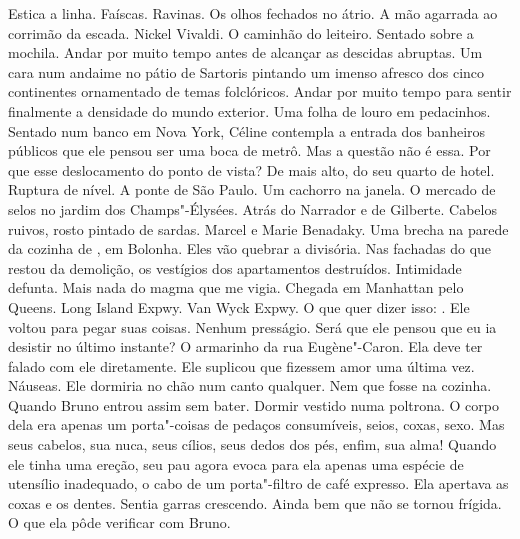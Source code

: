 Estica a linha. Faíscas. Ravinas. Os olhos fechados no átrio. A mão
agarrada ao corrimão da escada. Nickel Vivaldi. O caminhão do leiteiro.
Sentado sobre a mochila. Andar por muito tempo antes de alcançar as
descidas abruptas. Um cara num andaime no pátio de Sartoris pintando um
imenso afresco dos cinco continentes ornamentado de temas folclóricos.
Andar por muito tempo para sentir finalmente a densidade do mundo
exterior. Uma folha de louro em pedacinhos. Sentado num banco em Nova
York, Céline contempla a entrada dos banheiros públicos que ele pensou
ser uma boca de metrô. Mas a questão não é essa. Por que esse
deslocamento do ponto de vista? De mais alto, do seu quarto de hotel.
Ruptura de nível. A ponte de São Paulo. Um cachorro na janela. O mercado
de selos no jardim dos Champs"-Élysées. Atrás do Narrador e de Gilberte.
Cabelos ruivos, rosto pintado de sardas. Marcel e Marie Benadaky. Uma
brecha na parede da cozinha de , em Bolonha. Eles vão quebrar a
divisória. Nas fachadas do que restou da demolição, os vestígios dos
apartamentos destruídos. Intimidade defunta. Mais nada do magma que me
vigia. Chegada em Manhattan pelo Queens. Long Island Expwy. Van Wyck
Expwy. O que quer dizer isso: . Ele voltou para pegar suas coisas.
Nenhum presságio. Será que ele pensou que eu ia desistir no último
instante? O armarinho da rua Eugène"-Caron. Ela deve ter falado com ele
diretamente. Ele suplicou que fizessem amor uma última vez. Náuseas. Ele
dormiria no chão num canto qualquer. Nem que fosse na cozinha. Quando
Bruno entrou assim sem bater. Dormir vestido numa poltrona. O corpo dela
era apenas um porta"-coisas de pedaços consumíveis, seios, coxas, sexo.
Mas seus cabelos, sua nuca, seus cílios, seus dedos dos pés, enfim, sua
alma! Quando ele tinha uma ereção, seu pau agora evoca para ela apenas
uma espécie de utensílio inadequado, o cabo de um porta"-filtro de café
expresso. Ela apertava as coxas e os dentes. Sentia garras crescendo.
Ainda bem que não se tornou frígida. O que ela pôde verificar com Bruno.

